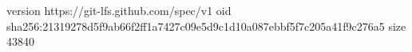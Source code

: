 version https://git-lfs.github.com/spec/v1
oid sha256:21319278d5f9ab66f2ff1a7427c09e5d9c1d10a087ebbf5f7c205a41f9c276a5
size 43840
